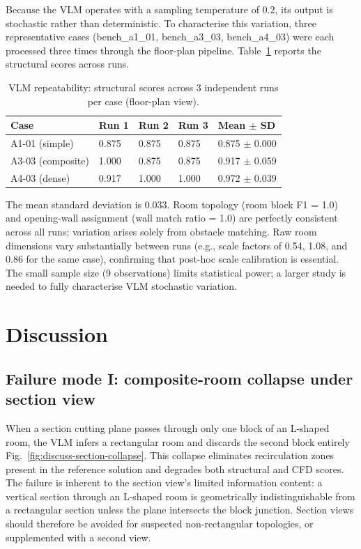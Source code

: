 \documentclass[preprint,12pt,number]{elsarticle}
\begin{document}
Because the VLM operates with a sampling temperature of 0.2, its output is stochastic rather than deterministic. To characterise this variation, three representative cases (bench\_a1\_01, bench\_a3\_03, bench\_a4\_03) were each processed three times through the floor-plan pipeline. Table~\ref{tab:result-vlm-repeatability} reports the structural scores across runs.

\begin{table}[htbp]
\centering
\caption{VLM repeatability: structural scores across 3 independent runs per case (floor-plan view).}
\label{tab:result-vlm-repeatability}
\begin{tabular}{lllll}
\toprule
Case & Run 1 & Run 2 & Run 3 & Mean $\pm$ SD \\
\midrule
A1-01 (simple) & 0.875 & 0.875 & 0.875 & 0.875 $\pm$ 0.000 \\
A3-03 (composite) & 1.000 & 0.875 & 0.875 & 0.917 $\pm$ 0.059 \\
A4-03 (dense) & 0.917 & 1.000 & 1.000 & 0.972 $\pm$ 0.039 \\
\bottomrule
\end{tabular}
\end{table}


The mean standard deviation is 0.033. Room topology (room block F1 = 1.0) and opening-wall assignment (wall match ratio = 1.0) are perfectly consistent across all runs; variation arises solely from obstacle matching. Raw room dimensions vary substantially between runs (e.g., scale factors of 0.54, 1.08, and 0.86 for the same case), confirming that post-hoc scale calibration is essential. The small sample size (9 observations) limits statistical power; a larger study is needed to fully characterise VLM stochastic variation.


\section{Discussion}
\label{sec:discussion}


\subsection{Failure mode I: composite-room collapse under section view}
\label{sec:failure-mode-i-composite-room-collapse-under-section-view}


When a section cutting plane passes through only one block of an L-shaped room, the VLM infers a rectangular room and discards the second block entirely Fig.~\ref{fig:discuss-section-collapse}. This collapse eliminates recirculation zones present in the reference solution and degrades both structural and CFD scores. The failure is inherent to the section view's limited information content: a vertical section through an L-shaped room is geometrically indistinguishable from a rectangular section unless the plane intersects the block junction. Section views should therefore be avoided for suspected non-rectangular topologies, or supplemented with a second view.
\end{document}
